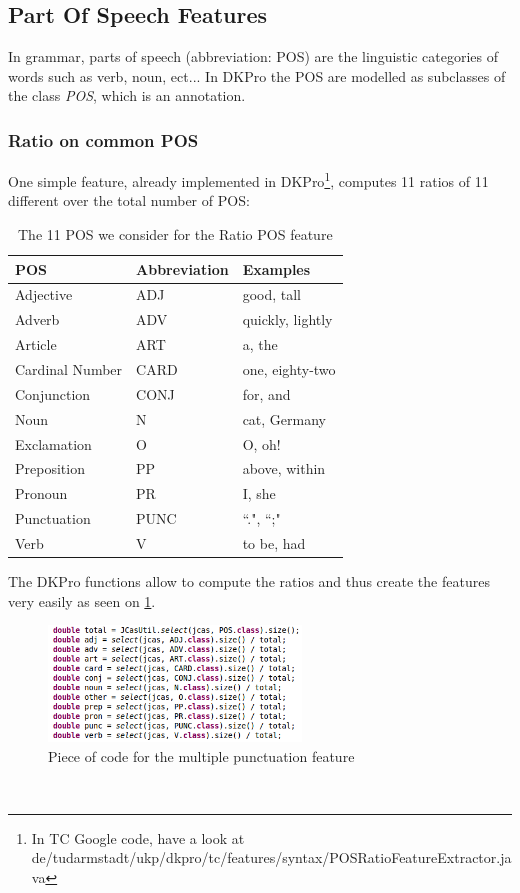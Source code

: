\subsection{Part Of Speech Features}
In grammar, parts of speech (abbreviation: POS) are the linguistic categories of words such as verb, noun, ect... In DKPro the POS are modelled as subclasses of the class \emph{POS}, which is an annotation. 

\subsubsection{Ratio on common POS}
One simple feature, already implemented in DKPro\footnote{In TC Google code, have a look at de/tudarmstadt/ukp/dkpro/tc/features/syntax/POSRatioFeatureExtractor.java}, computes 11 ratios of 11 different over the total number of POS:

\begin{table}[h]
\center
\begin{tabular}{|l|l|l|}
\hline
\rowcolor[HTML]{9B9B9B} 
POS             & Abbreviation & Examples         \\ \hline
Adjective       & ADJ          & good, tall       \\ \hline
Adverb          & ADV          & quickly, lightly \\ \hline
Article         & ART          & a, the           \\ \hline
Cardinal Number & CARD         & one, eighty-two  \\ \hline
Conjunction     & CONJ         & for, and         \\ \hline
Noun            & N            & cat, Germany     \\ \hline
Exclamation     & O            & O, oh!           \\ \hline
Preposition     & PP           & above, within    \\ \hline
Pronoun         & PR           & I, she           \\ \hline
Punctuation     & PUNC         & ``.", ``;"       \\ \hline
Verb            & V            & to be, had       \\ \hline
\end{tabular}
\caption{\label{11pos} The 11 POS we consider for the Ratio POS feature}
\end{table}

The DKPro functions allow to compute the ratios and thus create the features very easily as seen on \cref{fig:11poscode}.
\
\begin{figure}[H]
    \centering
    \includegraphics[width=0.6\textwidth]{fig/11pos.png}
    \caption[Short caption]{Piece of code for the multiple punctuation feature}
    \label{fig:11poscode}
\end{figure}
\
